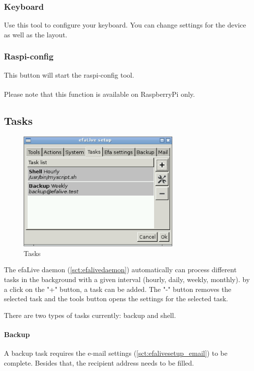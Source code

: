 \documentclass[a4paper,12pt,twoside]{article}
\begin{document}
\subsubsection{Keyboard}
\label{sct:efalivesetup_keyboard}
Use this tool to configure your keyboard. You can change settings for
the device as well as the layout.


\subsubsection{Raspi-config}
\label{sct:efalivesetup_raspi_config}
This button will start the raspi-config tool.\\
\\
Please note that this function is available on RaspberryPi only.


\subsection{Tasks}
\label{sct:efalivesetup_tasks}

\begin{figure}
    \centering
    \includegraphics[width=8cm]{screenshots/efalive_setup_tasks.png}
    \caption{Tasks}
    \label{fig:efalivesetup_tasks}
\end{figure}

The efaLive daemon (\ref{sct:efalivedaemon}) automatically can process 
different tasks in the background with a given interval (hourly, daily, 
weekly, monthly). by a click on the "+" button, a task can be added. The "-" 
button removes the selected task and the tools button opens the settings 
for the selected task.

There are two types of tasks currently: backup and shell.

\paragraph{Backup}
A backup task requires the e-mail settings (\ref{sct:efalivesetup_email})
to be complete. Besides that, the recipient address needs to be filled.
\end{document}
